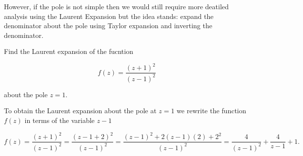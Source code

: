 \documentclass[english,a4paper,12pt]{report}
\begin{document}
However, if the pole is not simple then we would still require more deatiled analysis using the Laurent Expansion but the idea stands: expand the denominator about the pole using Taylor expansion and inverting the denominator.




{Find the Laurent expansion of the fucntion 

\begin{equation}
    f(z) = \frac{(z+1)^2}{(z-1)^2} 
\end{equation}

about the pole \(z = 1\). 
}
{To obtain the Laurent expansion about the pole at \(z = 1\) we rewrite the function \(f(z)\) in terms of the variable \(z-1\)  

\begin{equation}
    f(z) = \frac{(z+1)^2}{(z-1)^2} = \frac{(z-1+2)^2}{(z-1)^2} = \frac{(z-1)^2+2(z-1)(2)+2^2}{(z-1)^2} = \frac{4}{(z-1)^2} + \frac{4}{z-1} + 1.
\end{equation}
} 
\end{document}
